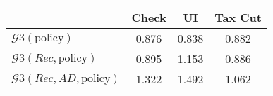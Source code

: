 \begin{tabular}{@{}lccc@{}} 
\toprule 
                          & Check      & UI    & Tax Cut    \\  \midrule 
$\mathcal{G}3(\text{policy})$ & 0.876  & 0.838  & 0.882     \\ 
$\mathcal{G}3(Rec,\text{policy})$ & 0.895  & 1.153  & 0.886     \\ 
$\mathcal{G}3(Rec, AD,\text{policy})$ & 1.322  & 1.492  & 1.062     \\ 
\end{tabular}  
